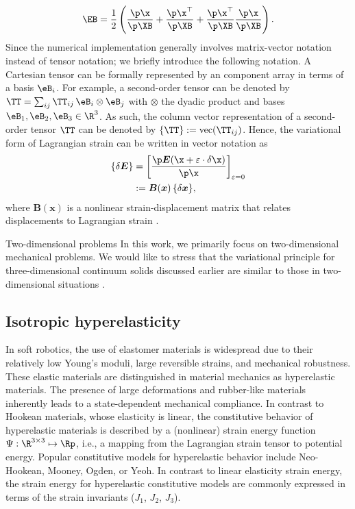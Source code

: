 %
\begin{equation}
\EB = \frac{1}{2}\left( \frac{\p \x}{\p \XB} + \frac{\p\x^\top}{\p \XB} + \frac{\p\x^\top}{\p \XB}\frac{\p\x}{\p \XB} \right). \label{eq:E_tens}
\end{equation}
%
Since the numerical implementation generally involves matrix-vector notation instead of tensor notation; we briefly introduce the following notation. A Cartesian tensor can be formally represented by an component array in terms of a basis $\eB_i$. For example, a second-order tensor can be denoted by $\TT = \sum_{ij}\TT_{ij}\, \eB_i \otimes \eB_j$ with $\otimes$ the dyadic product and bases $\eB_1,\eB_2,\eB_3 \in \R^3$. As such, the column vector representation of a second-order tensor $\TT$ can be denoted by $\{ \TT \} := \text{vec}({\TT}_{ij})$. Hence, the variational form of Lagrangian strain can be written in vector notation as
\begin{align}
\{\delta \boldsymbol{E} \} & = \left[\frac{\p \boldsymbol{E}(\x + \varepsilon \cdot \delta \x)}{\p \x} \right]_{\varepsilon = 0} \\ & := \boldsymbol{B}(\boldsymbol{x}) \, \{\delta  \boldsymbol{x}\},
\end{align}
where $\boldsymbol{B}(\boldsymbol{x})$ is a nonlinear strain-displacement matrix that relates displacements to Lagrangian strain \cite{Kim2018}. \\ 

\begin{rmk}{Two-dimensional problems}
In this work, we primarily focus on two-dimensional mechanical problems. We would like to stress that the variational principle for three-dimensional continuum solids discussed earlier are similar to those in two-dimensional situations \cite{Kim2018,Gain2013}. 
\end{rmk}

\subsection{Isotropic hyperelasticity}
In soft robotics, the use of elastomer materials is widespread due to their relatively low Young's moduli, large reversible strains, and mechanical robustness. These elastic materials are distinguished in material mechanics as hyperelastic materials. The presence of large deformations and rubber-like materials inherently leads to a state-dependent mechanical compliance. In contrast to Hookean materials, whose elasticity is linear, the constitutive behavior of hyperelastic materials is described by a (nonlinear) strain energy function ${\Psi}: \R^{3\times3} \mapsto \Rp$, i.e., a mapping from the Lagrangian strain tensor to potential energy. Popular constitutive models for hyperelastic behavior include Neo-Hookean, Mooney, Ogden, or Yeoh. In contrast to linear elasticity strain energy, the strain energy for hyperelastic constitutive models are commonly expressed in terms of the strain invariants (${J}_1$, ${J}_2$, ${J}_3$).

